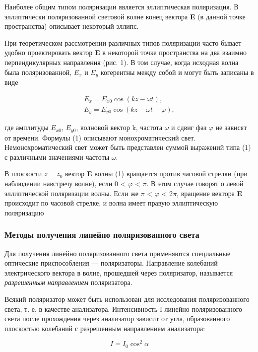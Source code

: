 \documentclass[a4paper,12pt]{article}
\begin{document}
Наиболее общим типом поляризации является эллиптическая поляризация. В эллиптически поляризованной световой волне конец вектора \textbf{E} (в данной точке пространства) описывает некоторый эллипс.

При теоретическом рассмотрении различных типов поляризации часто бывает удобно проектировать вектор \textbf{E} в некоторой точке пространства на два взаимно перпендикулярных направления (рис. 1). В том случае, когда исходная волна была поляризованной, $E_x$ и $E_y$ когерентны между собой и могут быть записаны в виде

\begin{equation}
\begin{gathered}
E_x = E_{x0} \cos(kz - \omega t), \\
E_y = E_{y0} \cos(kz - \omega t - \varphi),
\end{gathered}
\end{equation}

где амплитуды $E_{x0}$, $E_{y0}$, волновой вектор k,
частота $\omega$ и сдвиг фаз $\varphi$ не зависят от времени. Формулы (1) описывают монохроматический свет. Немонохроматический свет может быть представлен суммой выражений типа (1) с различными значениями частоты $\omega$.

В плоскости $z = z_0$ вектор \textbf{E} волны (1) вращается против часовой стрелки (при наблюдении навстречу волне), если 0 < $\varphi$ < $\pi$. В этом случае говорят о левой эллиптической поляризации волны. Если же $\pi$ < $\varphi$ < 2$\pi$, вращение вектора \textbf{E} происходит по часовой стрелке, и волна имеет правую эллиптическую поляризацию


\subsubsection*{Методы получения линейно поляризованного света}

Для получения линейно поляризованного света применяются специальные оптические приспособления — поляризаторы. Направление колебаний электрического вектора в волне, прошедшей через поляризатор, называется \textit{разрешенным направлением} поляризатора.

Всякий поляризатор может быть использован для исследования поляризованного света, т. е. в качестве анализатора. Интенсивность I линейно поляризованного света после прохождения через анализатор зависит от угла, образованного плоскостью колебаний с разрешенным направлением анализатора:

\begin{equation}
I = I_0 \cos^2 \alpha
\end{equation}
\end{document}
